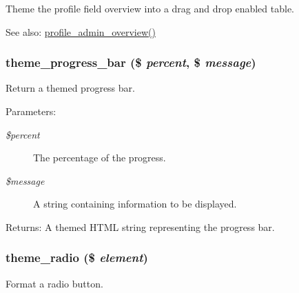 Theme the profile field overview into a drag and drop enabled table.

\begin{Desc}
\item[See also:]\hyperlink{group__forms_gf5de7da6a31a83a313aa279ec696e82c}{profile\_\-admin\_\-overview()} \end{Desc}
\hypertarget{group__themeable_g929fbdc2cc220d02dd1da889232991ff}{
\subsubsection[{theme\_\-progress\_\-bar}]{\setlength{\rightskip}{0pt plus 5cm}theme\_\-progress\_\-bar (\$ {\em percent}, \/  \$ {\em message})}}
\label{group__themeable_g929fbdc2cc220d02dd1da889232991ff}


Return a themed progress bar.

\begin{Desc}
\item[Parameters:]
\begin{description}
\item[{\em \$percent}]The percentage of the progress. \item[{\em \$message}]A string containing information to be displayed. \end{description}
\end{Desc}
\begin{Desc}
\item[Returns:]A themed HTML string representing the progress bar. \end{Desc}
\hypertarget{group__themeable_g3b9b7e0926e0b315d352192c1141b009}{
\subsubsection[{theme\_\-radio}]{\setlength{\rightskip}{0pt plus 5cm}theme\_\-radio (\$ {\em element})}}
\label{group__themeable_g3b9b7e0926e0b315d352192c1141b009}


Format a radio button.

